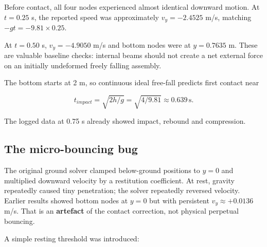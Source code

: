 \documentclass[
  10pt,
  a4paper,
]{article}
\begin{document}
Before contact, all four nodes experienced almost identical downward
motion. At \(t=0.25\) s, the reported speed was approximately
\(v_y=-2.4525\) m/s, matching \(-gt=-9.81\times0.25\).

At \(t=0.50\) s, \(v_y=-4.9050\) m/s and bottom nodes were at
\(y=0.7635\) m. These are valuable baseline checks: internal beams
should not create a net external force on an initially undeformed freely
falling assembly.

The bottom starts at 2 m, so continuous ideal free-fall predicts first
contact near

\[t_{impact}=\sqrt{2h/g}=\sqrt{4/9.81}\approx0.639\,\mathrm s.\]

The logged data at 0.75 s already showed impact, rebound and
compression.

\subsection{The micro-bouncing bug}\label{the-micro-bouncing-bug}

The original ground solver clamped below-ground positions to \(y=0\) and
multiplied downward velocity by a restitution coefficient. At rest,
gravity repeatedly caused tiny penetration; the solver repeatedly
reversed velocity. Earlier results showed bottom nodes at \(y=0\) but
with persistent \(v_y\approx+0.0136\) m/s. That is an \textbf{artefact}
of the contact correction, not physical perpetual bouncing.

A simple resting threshold was introduced:
\end{document}
